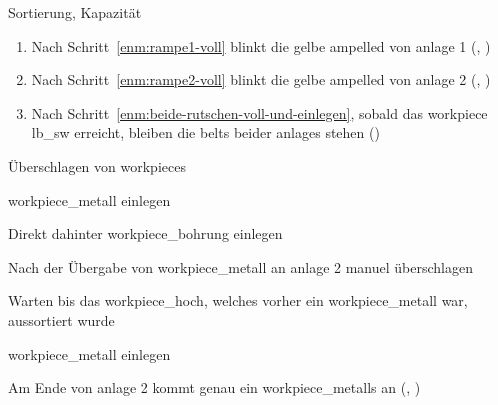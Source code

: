 \begin{abntest}{Sortierung, Kapazität}
    \erwartung
    \begin{enumerate}
        \item Nach Schritt~\ref{enm:rampe1-voll} blinkt die gelbe \gls{ampelled}
        von \gls{anlage} 1 (, ) %
        \item Nach Schritt~\ref{enm:rampe2-voll} blinkt die gelbe \gls{ampelled}
        von \gls{anlage} 2 (, ) %
        \item Nach Schritt~\ref{enm:beide-rutschen-voll-und-einlegen}, sobald das \gls{workpiece}
        \gls{lb_sw} erreicht, bleiben die \glspl{belt} beider \glspl{anlage} stehen ()
    \end{enumerate}

    \begin{ablauf}{Überschlagen von \glspl{workpiece}}
        \item \gls{workpiece_metall} einlegen
        \item Direkt dahinter \gls{workpiece_bohrung} einlegen
        \item Nach der Übergabe von \gls{workpiece_metall} an \gls{anlage} 2 manuel überschlagen
        \item Warten bis das \gls{workpiece_hoch}, welches vorher ein \gls{workpiece_metall} war,
        aussortiert wurde
        \item \gls{workpiece_metall} einlegen
    \end{ablauf}

    \erwartung
    Am Ende von \gls{anlage} 2 kommt genau ein \Glspl{workpiece_metall} an (, )

\end{abntest}
